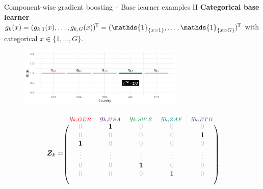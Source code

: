 \documentclass[10pt]{beamer}
\begin{document}
\begin{frame}{Component-wise gradient boosting -- Base learner examples II}
  \textbf{Categorical base learner} $g_k(x) = (g_{k,1}(x), \dots, g_{k,G}(x))^\tran = (\mathds{1}_{\{x = 1\}}, \dots, \mathds{1}_{\{x = G\}})^\tran$ with categorical $x\in\{1, \dots, G\}$.

  \begin{center}
    \begin{figure}
      \includegraphics[width=0.7\textwidth]{figures/bs-cat/fig-cat5.png}
    \end{figure}
    \vspace{-0.5cm}
    \scriptsize
    $$
      \design_k = \begin{blockarray}{ccccc}
        \color[HTML]{EE0000}g_{k,GER} & \color[HTML]{631879}g_{k,USA} & \color[HTML]{008B45}g_{k,SWE} & \color[HTML]{008280}g_{k,ZAF} & \color[HTML]{3B4992}g_{k,ETH}\\
      \begin{block}{(ccccc)}
        \color{lightgray}0 & \color{black}\bm{1} & \color{lightgray}0 & \color{lightgray}0 & \color{lightgray}0 \\
      \color{lightgray}0 & \color{lightgray}0 & \color{lightgray}0 & \color{lightgray}0 & \color{black}\bm{1} \\
      \color{black}\bm{1} & \color{lightgray}0 & \color{lightgray}0 & \color{lightgray}0 & \color{lightgray}0 \\
      \color{lightgray}\vdots & \color{lightgray}\vdots & \color{lightgray}\vdots & \color{lightgray}\vdots & \color{lightgray}\vdots \\
      \color{lightgray}0 & \color{lightgray}0 & \color{black}\bm{1} & \color{lightgray}0 & \color{lightgray}0 \\
      \color{lightgray}0 & \color{lightgray}0 & \color{lightgray}0 & \color[HTML]{008280}\bm{1} & \color{lightgray}0 \\
      \color{white}0 & \color{white}0 & \color{white}0 & \color{white}0 & \color{white}0 \color{black}\\
      \end{block}
    \end{blockarray}
    $$
    \normalsize
  \end{center}
\end{frame}
\end{document}
